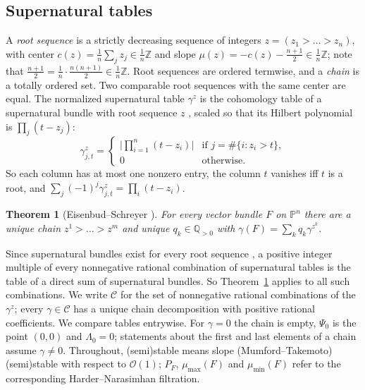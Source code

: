 \documentclass[11pt]{amsart}
\newtheorem{theorem}{Theorem}[section]
\theoremstyle{definition}
\theoremstyle{remark}
\newcommand{\PP}{\mathbb{P}}
\newcommand{\QQ}{\mathbb{Q}}
\newcommand{\ZZ}{\mathbb{Z}}
\newcommand{\OO}{\mathcal{O}}
\newcommand{\CC}{\mathcal{C}}
\begin{document}
\subsection{Supernatural tables}
A \emph{root sequence} is a strictly decreasing sequence of integers $z=(z_1>\dots>z_n)$, with center $c(z)=\frac1n\sum_jz_j\in\frac1n\ZZ$ and slope $\mu(z)=-c(z)-\frac{n+1}2\in\frac1n\ZZ$; note that $\frac{n+1}2=\frac1n\cdot\frac{n(n+1)}2\in\frac1n\ZZ$. Root sequences are ordered termwise, and a \emph{chain} is a totally ordered set. Two comparable root sequences with the same center are equal. The normalized supernatural table $\gamma^z$ is the cohomology table of a supernatural bundle with root sequence $z$ \cite[Thm.~0.4, \S6]{ES09}, scaled so that its Hilbert polynomial is $\prod_j(t-z_j)$:
\[
\gamma^z_{j,t}=\begin{cases}\big|\prod_{i=1}^n(t-z_i)\big| & \text{if } j=\#\{i:z_i>t\},\\ 0 & \text{otherwise.}\end{cases}
\]
So each column has at most one nonzero entry, the column $t$ vanishes iff $t$ is a root, and $\sum_j(-1)^j\gamma^z_{j,t}=\prod_i(t-z_i)$.

\begin{theorem}[Eisenbud--Schreyer {\cite[Thm.~0.5]{ES09}}]\label{thm:ES}
For every vector bundle $F$ on $\PP^n$ there are a unique chain $z^1>\dots>z^m$ and unique $q_k\in\QQ_{>0}$ with $\gamma(F)=\sum_kq_k\gamma^{z^k}$.
\end{theorem}

Since supernatural bundles exist for every root sequence \cite[Thm.~0.4]{ES09}, a positive integer multiple of every nonnegative rational combination of supernatural tables is the table of a direct sum of supernatural bundles. So Theorem~\ref{thm:ES} applies to all such combinations. We write $\CC$ for the set of nonnegative rational combinations of the $\gamma^z$; every $\gamma\in\CC$ has a unique chain decomposition with positive rational coefficients. We compare tables entrywise. For $\gamma=0$ the chain is empty, $\Psi_0$ is the point $(0,0)$ and $\Lambda_0=0$; statements about the first and last elements of a chain assume $\gamma\ne0$. Throughout, (semi)stable means slope (Mumford--Takemoto) (semi)stable with respect to $\OO(1)$; $P_F$, $\mu_{\max}(F)$ and $\mu_{\min}(F)$ refer to the corresponding Harder--Narasimhan filtration.
\end{document}
